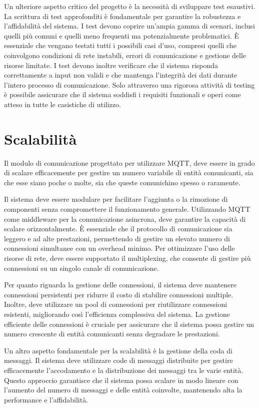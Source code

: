 \documentclass[12pt,a4paper,openright,twoside]{book}
\begin{document}
Un ulteriore aspetto critico del progetto è la necessità di sviluppare test esaustivi. La scrittura di test approfonditi è fondamentale per garantire la robustezza 
e l'affidabilità del sistema. I test devono coprire un'ampia gamma di scenari, inclusi quelli più comuni e quelli meno frequenti ma potenzialmente problematici. 
È essenziale che vengano testati tutti i possibili casi d'uso, compresi quelli che coinvolgono condizioni di rete instabili, errori di comunicazione e gestione 
delle risorse limitate. I test devono inoltre verificare che il sistema risponda correttamente a input non validi e che mantenga l'integrità dei dati durante 
l'intero processo di comunicazione. Solo attraverso una rigorosa attività di testing è possibile assicurare che il sistema soddisfi i requisiti funzionali e 
operi come atteso in tutte le casistiche di utilizzo.

\section{Scalabilità}

Il modulo di comunicazione progettato per utilizzare \ac{MQTT}, deve essere in grado di scalare efficacemente per gestire un numero variabile 
di entità comunicanti, sia che esse siano poche o molte, sia che queste comunichino spesso o raramente.

Il sistema deve essere modulare per facilitare l'aggiunta o la rimozione di componenti senza compromettere il funzionamento generale. 
Utilizzando \ac{MQTT} come middleware per la comunicazione asincrona, deve garantire la capacità di scalare orizzontalmente. 
È essenziale che il protocollo di comunicazione sia leggero e ad alte prestazioni, permettendo di gestire un elevato numero di connessioni simultanee 
con un overhead minimo. Per ottimizzare l'uso delle risorse di rete, deve essere supportato il multiplexing, che consente di gestire più connessioni 
su un singolo canale di comunicazione.

Per quanto riguarda la gestione delle connessioni, il sistema deve mantenere connessioni persistenti per ridurre il costo di stabilire connessioni multiple. 
Inoltre, deve utilizzare un pool di connessioni per riutilizzare connessioni esistenti, migliorando così l'efficienza complessiva del sistema. 
La gestione efficiente delle connessioni è cruciale per assicurare che il sistema possa gestire un numero crescente di entità comunicanti senza degradare le prestazioni.

Un altro aspetto fondamentale per la scalabilità è la gestione della coda di messaggi. Il sistema deve utilizzare code di messaggi distribuite per gestire efficacemente 
l'accodamento e la distribuzione dei messaggi tra le varie entità. Questo approccio garantisce che il sistema possa scalare in modo lineare con l'aumento del numero 
di messaggi e delle entità coinvolte, mantenendo alta la performance e l'affidabilità.
\end{document}
